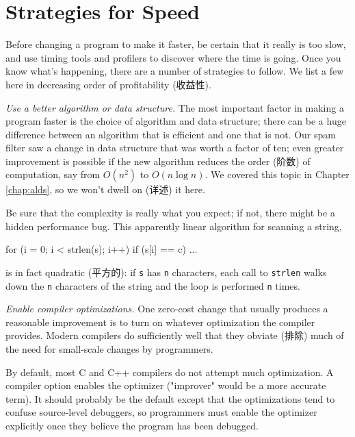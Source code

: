 \section{Strategies for Speed}

Before changing a program to make it faster, be certain that it really is
too slow, and use timing tools and profilers to discover where the time is
going.  Once you know what's happening, there are a number of strategies to
follow. We list a few here in decreasing order of profitability (收益性).

\emph{Use a better algorithm or data structure.} The most important factor
in making a program faster is the choice of algorithm and data structure;
there can be a huge difference between an algorithm that is efficient and
one that is not. Our spam filter saw a change in data structure that was
worth a factor of ten; even greater improvement is possible if the new
algorithm reduces the order (阶数) of computation, say from $O(n^2)$ to
$O(n \log n)$. We covered this topic in Chapter \ref{chap:alds}, so we
won't dwell on (详述) it here.

Be sure that the complexity is really what you expect; if not, there might
be a hidden performance bug. This apparently linear algorithm for scanning
a string,
\begin{badcode}
    for (i = 0; i < strlen(s); i++)
        if (s[i] == c)
            ...
\end{badcode}
is in fact quadratic (平方的): if \verb's' has \verb'n' characters, each
call to \verb'strlen' walks down the \verb'n' characters of the string and
the loop is performed \verb'n' times.

\emph{Enable compiler optimizations.} One zero-cost change that usually
produces a reasonable improvement is to turn on whatever optimization the
compiler provides.  Modern compilers do sufficiently well that they obviate
(排除) much of the need for small-scale changes by programmers.

By default, most C and C++ compilers do not attempt much optimization. A
compiler option enables the optimizer ("improver" would be a more accurate
term). It should probably be the default except that the optimizations tend
to confuse source-level debuggers, so programmers must enable the optimizer
explicitly once they believe the program has been debugged.

